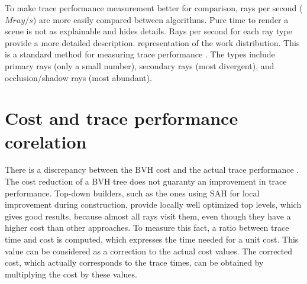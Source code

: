 
To make trace performance measurement better for comparison, rays per second ($Mray/s$) are more easily compared between algorithms. Pure time to render a scene is not as explainable and hides details. Rays per second for each ray type provide a more detailed description. representation of the work distribution. This is a standard method for measuring trace performance \cite{MB22}. The types include primary rays (only a small number), secondary rays (most divergent), and occlusion/shadow rays (most abundant). 

\section{Cost and trace performance corelation}

There is a discrepancy between the BVH cost and the actual trace performance \cite{AK13}. The cost reduction of a BVH tree does not guaranty an improvement in trace performance. Top-down builders, such as the ones using SAH for local improvement during construction, provide locally well optimized top levels, which gives good results, because almost all rays visit them, even though they have a higher cost than other approaches. To measure this fact, a ratio between trace time and cost is computed, which expresses the time needed for a unit cost. This value can be considered as a correction to the actual cost values. The corrected cost, which actually corresponds to the trace times, can be obtained by multiplying the cost by these values. \cite{MB22}

